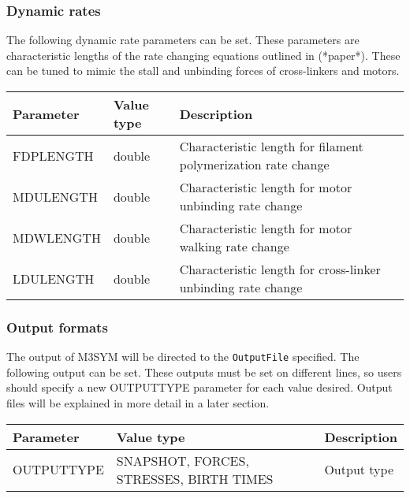 \documentclass[11pt, oneside]{article}   	%
\begin{document}
\subsubsection{Dynamic rates}

The following dynamic rate parameters can be set. These parameters are characteristic lengths of the rate changing equations outlined in (*paper*). These can be tuned to mimic the stall and unbinding forces of cross-linkers and motors.

\begin{table} [!ht]
\centering
\begin{tabular}{|L{5cm}|C{4cm}|L{6cm}|}  
\hline
 \textbf{Parameter} & \textbf{Value type} & \textbf{Description} \\
 \hline
  FDPLENGTH & double & Characteristic length for filament polymerization rate change \\
  \hline
  MDULENGTH & double & Characteristic length for motor unbinding rate change \\
  \hline
  MDWLENGTH & double & Characteristic length for motor walking rate change \\
  \hline
 LDULENGTH & double & Characteristic length for cross-linker unbinding rate change \\
  \hline
 
\end{tabular}
\end{table}

\subsubsection{Output formats}

The output of M3SYM will be directed to the \texttt{OutputFile} specified. The following output can be set. These outputs must be set on different lines, so users should specify a new OUTPUTTYPE parameter for each value desired. Output files will be explained in more detail in a later section.

\begin{table} [!ht]
\centering
\begin{tabular}{|L{5cm}|C{3cm}|L{6cm}|}  
\hline
 \textbf{Parameter} & \textbf{Value type} & \textbf{Description} \\
 \hline
  OUTPUTTYPE & SNAPSHOT, FORCES, STRESSES, BIRTH TIMES & Output type\\
  \hline
 
\end{tabular}
\end{table}
\end{document}
